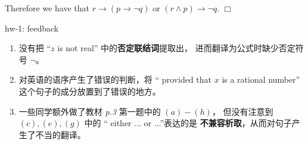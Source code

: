 \documentclass[UTF8,12pt,a4paper]{ctexart}
\begin{document}
\indent 
Therefore we have that $r \to (p \to \neg q)$ or $(r \land p) \to \neg q$.
\hfill $\Box$


\vspace{1em}
\dotfill hw-1: feedback 
\dotfill

\begin{enumerate}
\item 没有把 “$z$ is {\color{purple} not} real” 中的\textbf{否定联结词}提取出，
进而翻译为公式时缺少否定符号 $\neg$。

\item 对英语的语序产生了错误的判断，将 “{\color{purple} provided that} $x$ is a rational number” 这个句子的成分放置到了错误的地方。

\item 一些同学额外做了教材 \textit{p.3} 第一题中的 $(a)-(h)$， 
但没有注意到 $(c),(e),(g)$ 中的 “{\color{purple} either} ... {\color{purple} or} ...”表达的是
\textbf{不兼容析取}，从而对句子产生了不当的翻译。
\end{enumerate}
\end{document}
